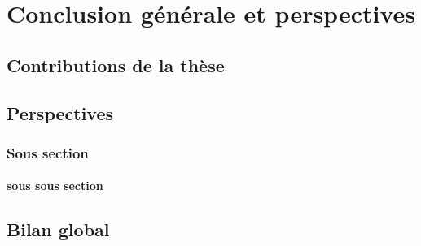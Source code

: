 


\chapter*{Conclusion générale et perspectives}
\mtcaddchapter



\section*{Contributions de la thèse}


\section*{Perspectives}


\subsection*{Sous section}

\subsubsection*{sous sous section}


\section*{Bilan global}

